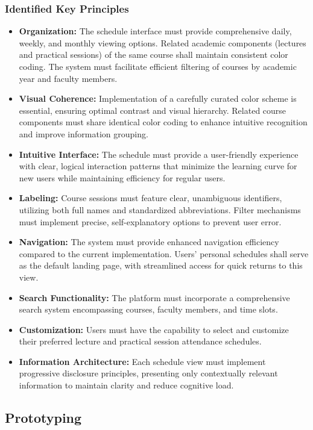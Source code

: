 \documentclass[sigconf,nonacm]{acmart}
\begin{document}
\subsubsection{\textbf{Identified Key Principles}}
\begin{itemize}
\item \textbf{Organization:} The schedule interface must provide comprehensive daily, weekly, and monthly viewing options. Related academic components (lectures and practical sessions) of the same course shall maintain consistent color coding. The system must facilitate efficient filtering of courses by academic year and faculty members.
\item \textbf{Visual Coherence:} Implementation of a carefully curated color scheme is essential, ensuring optimal contrast and visual hierarchy. Related course components must share identical color coding to enhance intuitive recognition and improve information grouping.
\item \textbf{Intuitive Interface:} The schedule must provide a user-friendly experience with clear, logical interaction patterns that minimize the learning curve for new users while maintaining efficiency for regular users.
\item \textbf{Labeling:} Course sessions must feature clear, unambiguous identifiers, utilizing both full names and standardized abbreviations. Filter mechanisms must implement precise, self-explanatory options to prevent user error.
\item \textbf{Navigation:} The system must provide enhanced navigation efficiency compared to the current implementation. Users' personal schedules shall serve as the default landing page, with streamlined access for quick returns to this view.
\item \textbf{Search Functionality:} The platform must incorporate a comprehensive search system encompassing courses, faculty members, and time slots.
\item \textbf{Customization:} Users must have the capability to select and customize their preferred lecture and practical session attendance schedules.
\item \textbf{Information Architecture:} Each schedule view must implement progressive disclosure principles, presenting only contextually relevant information to maintain clarity and reduce cognitive load.
\end{itemize}

\subsection{Prototyping}
\end{document}
